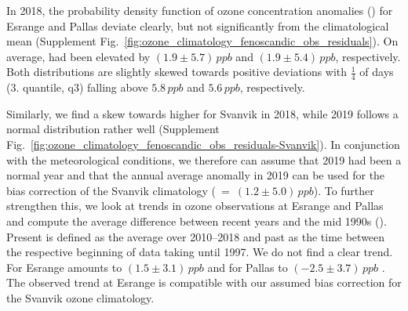 \documentclass[bg, manuscript]{copernicus}
\begin{document}
In 2018, the probability density function of ozone concentration anomalies (\chem{\Delta[O_3]}) for Esrange and Pallas deviate clearly, but not significantly from the climatological mean (Supplement Fig.~\ref{fig:ozone_climatology_fenoscandic_obs_residuals}). On average, \chem{[O_3]} had been elevated by $(1.9\pm 5.7)\,\unit{ppb}$ and $(1.9\pm 5.4)\,\unit{ppb}$, respectively. Both distributions are slightly skewed towards positive deviations with $\frac{1}{4}$ of days (3. quantile, q3) falling above $5.8\,\unit{ppb}$ and $5.6\,\unit{ppb}$, respectively.

Similarly, we find a skew towards higher \chem{[O_3]} for Svanvik in 2018, while 2019 follows a normal distribution rather well (Supplement Fig.~\ref{fig:ozone_climatology_fenoscandic_obs_residuals-Svanvik}). In conjunction with the meteorological conditions, we therefore can assume that 2019 had been a normal year and that the annual average anomally in 2019 can be used for the bias correction of the Svanvik climatology (\chem{\left<\Delta[O_3]\right>}~=~$(1.2\pm 5.0)\,\unit{ppb}$). To further strengthen this, we look at trends in ozone observations at Esrange and Pallas and compute the average difference between recent years and the mid 1990s (). Present is defined as the average over 2010--2018 and past as the time between the respective beginning of data taking until 1997. We do not find a clear trend. For Esrange  amounts to $(1.5\pm 3.1)\,\unit{ppb}$ and for Pallas to $(-2.5\pm 3.7)\,\unit{ppb}$ \citep[][for comparison]{NILU2003, BER:Ruoho-Airola2015}. The observed trend at Esrange is compatible with our assumed bias correction for the Svanvik ozone climatology.

\end{document}
